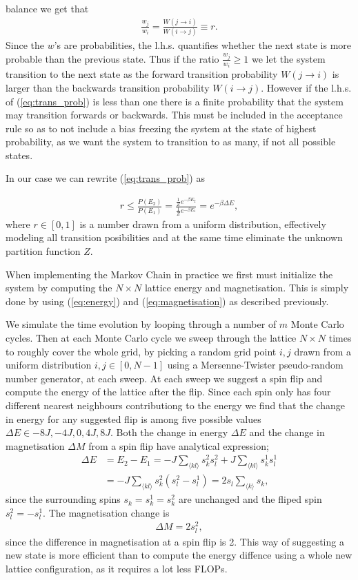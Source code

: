 \documentclass[twocolumn]{aastex62}
\begin{document}
balance we get that
\begin{align}
	\frac{w_j}{w_i} = \frac{W(j \to i)}{W(i \to j)} \equiv r.
	\label{eq:trans_prob}
\end{align}
Since the $w$'s are probabilities, the l.h.s. quantifies whether the next state
is more probable than the previous state. Thus if the ratio
$\frac{w_j}{w_i}\geq 1$ we let the system transition to the next state as the
forward transition probability $W(j \to i)$ is larger than the backwards
transition probability $W(i \to j)$. However if the l.h.s. of
(\ref{eq:trans_prob}) is less than one there is a finite probability that the
system may transition forwards or backwards. This must be included in the acceptance rule so as
to not include a bias freezing the system at the state of highest probability,
as we want the system to transition to as many, if not all possible states.

In our case we can rewrite (\ref{eq:trans_prob}) as

\begin{align}
	r \leq \frac{P(E_2)}{P(E_1)} = \frac{\frac{1}{Z}e^{-\beta E_2}}{\frac{1}{Z}e^{-\beta E_1}} = e^{-\beta\Delta E},
\end{align}
where $r\in[0, 1]$ is a number drawn from a uniform distribution, effectively
modeling all transition posibilities and at the same time eliminate the unknown
partition function $Z$.

When implementing the Markov Chain in practice we first must initialize the
system by computing the $N\times N$ lattice energy and magnetisation.
This is simply done by using (\ref{eq:energy}) and (\ref{eq:magnetisation}) as
described previously.

We simulate the time evolution by looping through a number of $m$ Monte Carlo
cycles. Then at each Monte Carlo cycle we sweep through the lattice $N\times N$
times to roughly cover the whole grid, by picking a random grid point $i, j$
drawn from a uniform distribution $i,j\in[0, N-1]$ using a Mersenne-Twister
pseudo-random number generator, at each sweep. At each sweep we
suggest a spin flip and compute the energy of the lattice after the flip. Since each spin only has four different nearest neighbours
contributiong
to
the energy we find that the change in energy for any suggested flip is among
five possible values $\Delta E \in {-8J, -4J, 0, 4J, 8J}$. Both the change in
energy $\Delta E$ and the change in magnetisation $\Delta M$ from a spin flip have analytical
expression;
\begin{align}
	\Delta E &= E_2 - E_1 = -J\sum_{\langle kl\rangle}s_k^2s_l^2 + J\sum_{\langle kl\rangle}s_k^1s_l^1 \\
	&= -J\sum_{\langle kl\rangle}s_k^2(s_l^2-s_l^1) = 2s_l\sum_{\langle k\rangle} s_k,
\end{align}
since the surrounding spins $s_k = s_k^1 = s_k^2$ are unchanged and the fliped
spin $s_l^2 = -s_l^1$. The magnetisation change is
\begin{align}
	\Delta M = 2s_l^2,
\end{align}
since the difference in magnetisation at a spin flip is 2. This way of
suggesting a new state is more efficient than to compute the energy diffence
using a whole new lattice configuration, as it requires a lot less FLOPs.
\end{document}
